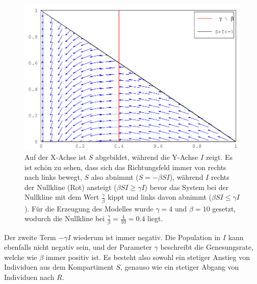 \begin{refsection}
\begin{figure}[t]
  \centering
  \includegraphics[width=.8\textwidth]{sir/images/quiver}
  \caption[Nullkline]{Auf der X-Achse ist $S$ abgebildet, während die Y-Achse $I$ zeigt. Es ist schön zu sehen, dass sich das Richtungsfeld immer von rechts nach links bewegt, $S$ also abnimmt ($S = - \beta S I$), während $I$ rechts der Nullkline (Rot) ansteigt ($\beta S I \ge \gamma I$) bevor das System bei der Nullkline mit dem Wert $\frac{\gamma}{\beta}$ kippt und links davon abnimmt ($\beta S I \le \gamma I$). Für die Erzeugung des Modelles wurde $\gamma = 4$ und $\beta = 10$ gesetzt, wodurch die Nullkline bei $\frac{\gamma}{\beta} = \frac{4}{10} = 0.4$ liegt.} 
  \label{fig:quiver}
\end{figure}

Der zweite Term $- \gamma I$ wiederum ist immer negativ. 
Die Population in $I$ kann ebenfalls nicht negativ sein, und der Parameter $\gamma$ beschreibt die Genesungsrate, welche wie $\beta$ immer positiv ist.
Es besteht also sowohl ein stetiger Anstieg von Individuen aus dem Kompartiment $S$, genauso wie ein stetiger Abgang von Individuen nach $R$.


\end{refsection}
